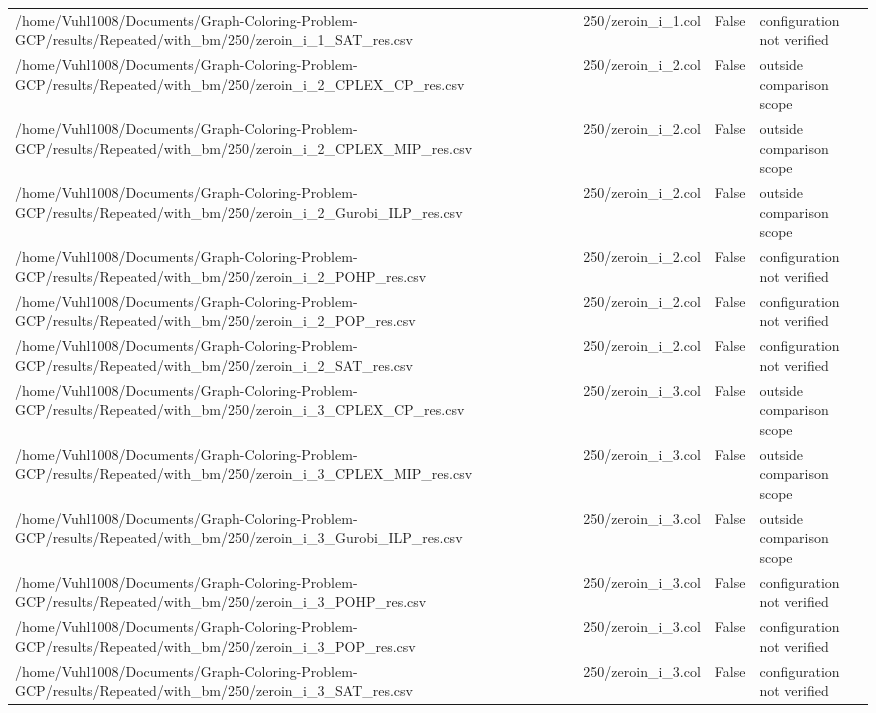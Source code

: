 \begin{table}[htbp]
\begin{tabular}{llll}
/home/Vuhl1008/Documents/Graph-Coloring-Problem-GCP/results/Repeated/with\_bm/250/zeroin\_i\_1\_SAT\_res.csv & 250/zeroin\_i\_1.col & False & configuration not verified \\
/home/Vuhl1008/Documents/Graph-Coloring-Problem-GCP/results/Repeated/with\_bm/250/zeroin\_i\_2\_CPLEX\_CP\_res.csv & 250/zeroin\_i\_2.col & False & outside comparison scope \\
/home/Vuhl1008/Documents/Graph-Coloring-Problem-GCP/results/Repeated/with\_bm/250/zeroin\_i\_2\_CPLEX\_MIP\_res.csv & 250/zeroin\_i\_2.col & False & outside comparison scope \\
/home/Vuhl1008/Documents/Graph-Coloring-Problem-GCP/results/Repeated/with\_bm/250/zeroin\_i\_2\_Gurobi\_ILP\_res.csv & 250/zeroin\_i\_2.col & False & outside comparison scope \\
/home/Vuhl1008/Documents/Graph-Coloring-Problem-GCP/results/Repeated/with\_bm/250/zeroin\_i\_2\_POHP\_res.csv & 250/zeroin\_i\_2.col & False & configuration not verified \\
/home/Vuhl1008/Documents/Graph-Coloring-Problem-GCP/results/Repeated/with\_bm/250/zeroin\_i\_2\_POP\_res.csv & 250/zeroin\_i\_2.col & False & configuration not verified \\
/home/Vuhl1008/Documents/Graph-Coloring-Problem-GCP/results/Repeated/with\_bm/250/zeroin\_i\_2\_SAT\_res.csv & 250/zeroin\_i\_2.col & False & configuration not verified \\
/home/Vuhl1008/Documents/Graph-Coloring-Problem-GCP/results/Repeated/with\_bm/250/zeroin\_i\_3\_CPLEX\_CP\_res.csv & 250/zeroin\_i\_3.col & False & outside comparison scope \\
/home/Vuhl1008/Documents/Graph-Coloring-Problem-GCP/results/Repeated/with\_bm/250/zeroin\_i\_3\_CPLEX\_MIP\_res.csv & 250/zeroin\_i\_3.col & False & outside comparison scope \\
/home/Vuhl1008/Documents/Graph-Coloring-Problem-GCP/results/Repeated/with\_bm/250/zeroin\_i\_3\_Gurobi\_ILP\_res.csv & 250/zeroin\_i\_3.col & False & outside comparison scope \\
/home/Vuhl1008/Documents/Graph-Coloring-Problem-GCP/results/Repeated/with\_bm/250/zeroin\_i\_3\_POHP\_res.csv & 250/zeroin\_i\_3.col & False & configuration not verified \\
/home/Vuhl1008/Documents/Graph-Coloring-Problem-GCP/results/Repeated/with\_bm/250/zeroin\_i\_3\_POP\_res.csv & 250/zeroin\_i\_3.col & False & configuration not verified \\
/home/Vuhl1008/Documents/Graph-Coloring-Problem-GCP/results/Repeated/with\_bm/250/zeroin\_i\_3\_SAT\_res.csv & 250/zeroin\_i\_3.col & False & configuration not verified \\

\end{tabular}
\end{table}
